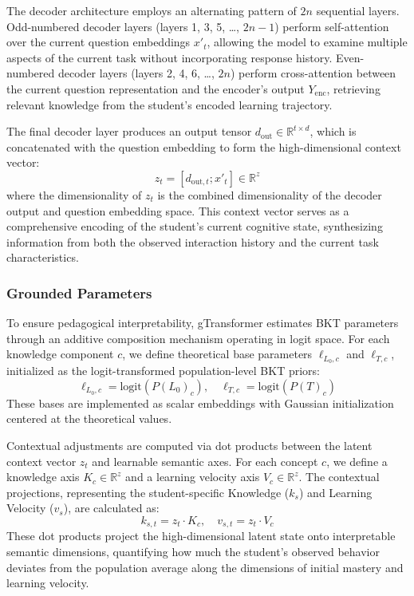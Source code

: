 \documentclass[applsci,article,submit,moreauthors,pdftex]{Definitions/mdpi}
\begin{document}
The decoder architecture employs an alternating pattern of $2n$ sequential layers. Odd-numbered decoder layers (layers 1, 3, 5, \ldots, $2n-1$) perform self-attention over the current question embeddings $x'_t$, allowing the model to examine multiple aspects of the current task without incorporating response history. Even-numbered decoder layers (layers 2, 4, 6, \ldots, $2n$) perform cross-attention between the current question representation and the encoder's output $Y_{\text{enc}}$, retrieving relevant knowledge from the student's encoded learning trajectory. 

The final decoder layer produces an output tensor $d_{\text{out}} \in \mathbb{R}^{t \times d}$, which is concatenated with the question embedding to form the high-dimensional context vector:
\begin{equation} \label{eq:context_vector}
    z_t = [d_{\text{out},t}; x'_t] \in \mathbb{R}^{z}
\end{equation}
where the dimensionality of $z_t$ is the combined dimensionality of the decoder output and question embedding space. This context vector serves as a comprehensive encoding of the student's current cognitive state, synthesizing information from both the observed interaction history and the current task characteristics.

\subsubsection{Grounded Parameters} \label{sec_grounded_params}

To ensure pedagogical interpretability, gTransformer estimates BKT parameters through an additive composition mechanism operating in logit space. For each knowledge component $c$, we define theoretical base parameters $\ell_{L_0,c}$ and $\ell_{T,c}$, initialized as the logit-transformed population-level BKT priors:
\begin{equation} \label{eq:theory_base}
    \ell_{L_0,c} = \text{logit}(P(L_0)_c), \quad \ell_{T,c} = \text{logit}(P(T)_c)
\end{equation}
These bases are implemented as scalar embeddings with Gaussian initialization centered at the theoretical values.

Contextual adjustments are computed via dot products between the latent context vector $z_t$ and learnable semantic axes. For each concept $c$, we define a knowledge axis $K_{c} \in \mathbb{R}^{z}$ and a learning velocity axis $V_{c} \in \mathbb{R}^{z}$. The contextual projections, representing the student-specific Knowledge ($k_s$) and Learning Velocity ($v_s$), are calculated as:
\begin{equation} \label{eq:contextual_projection}
    k_{s,t} = z_t \cdot K_c, \quad v_{s,t} = z_t \cdot V_c
\end{equation}
These dot products project the high-dimensional latent state onto interpretable semantic dimensions, quantifying how much the student's observed behavior deviates from the population average along the dimensions of initial mastery and learning velocity.
\end{document}
